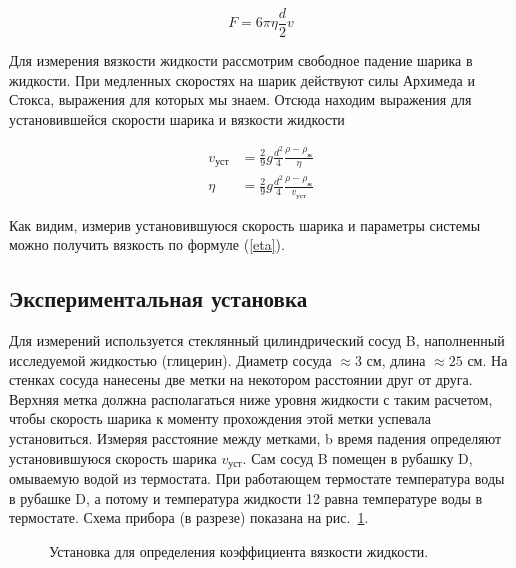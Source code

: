 \documentclass[a4paper, 12pt]{article}
\begin{document}
    \begin{equation}\label{stokes}
        F = 6\pi\eta \frac{d}{2}v
    \end{equation}


    Для измерения вязкости жидкости рассмотрим свободное падение шарика в жидкости. При медленных скоростях на шарик действуют силы Архимеда и Стокса, выражения для которых мы знаем. Отсюда находим выражения для установившейся скорости шарика и вязкости жидкости

    \begin{align}
        v_{уст}&=\frac{2}{9}g\frac{d^2}{4}\frac{\rho - \rho_ж}{\eta}\label{v_ust}\\
        \eta&=\frac{2}{9}g\frac{d^2}{4}\frac{\rho - \rho_ж}{v_{уст}}\label{eta}
    \end{align}

    Как видим, измерив установившуюся скорость шарика и параметры системы можно получить вязкость по формуле (\ref{eta}).

    \subsection{Экспериментальная установка}
    Для измерений используется стеклянный цилиндрический сосуд B, наполненный исследуемой жидкостью (глицерин). Диаметр сосуда $\approx 3$ см, длина $\approx 25$ см. На стенках сосуда нанесены две метки на некотором расстоянии друг от друга. Верхняя метка должна располагаться ниже уровня жидкости с таким расчетом, чтобы скорость шарика к моменту прохождения этой метки успевала установиться. Измеряя расстояние между метками, b время падения определяют установившуюся скорость шарика $v_{уст}$. Сам сосуд B помещен в рубашку D, омываемую водой из термостата. При работающем термостате температура воды в рубашке D, а потому и температура жидкости 12 равна температуре воды в термостате.
    Схема прибора (в разрезе) показана на рис.~\ref{ustanovka}.
    \begin{figure}[ht]
        \caption{Установка для определения коэффициента вязкости жидкости.}
        \label{ustanovka}
    \end{figure}
\end{document}
